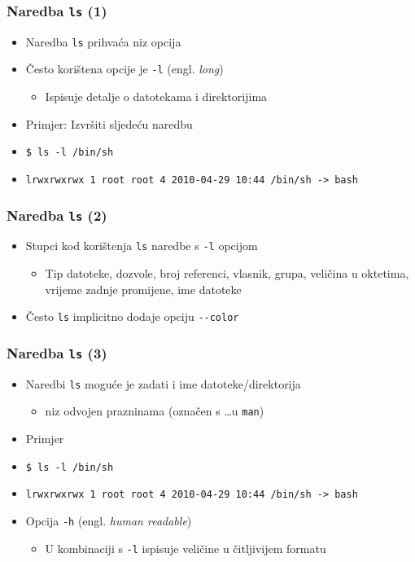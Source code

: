 \documentclass{beamer}
\begin{document}
\begin{frame}[t]
\frametitle{Naredba \texttt{ls} (1)}
\begin{itemize}
  \item Naredba \texttt{ls} prihvaća niz opcija
  \item Često korištena opcije je \texttt{-l} (engl. \emph{long})
  \begin{itemize}
    \item Ispisuje detalje o datotekama i direktorijima
  \end{itemize}
  \item Primjer: Izvršiti sljedeću naredbu
  \item[] \small\texttt{\$ ls -l /bin/sh}
  \item[] \small\texttt{lrwxrwxrwx 1 root root 4 2010-04-29 10:44 /bin/sh 
                        -> bash}
\end{itemize}
\end{frame}

\begin{frame}[t]
\frametitle{Naredba \texttt{ls} (2)}
\begin{itemize}
  \item Stupci kod korištenja \texttt{ls} naredbe s \texttt{-l} opcijom
  \begin{itemize}
    \item Tip datoteke, dozvole, broj referenci, vlasnik, grupa, veličina
          u oktetima, vrijeme zadnje promijene, ime datoteke
  \end{itemize}
  \item Često \texttt{ls} implicitno dodaje opciju \texttt{-{}-color}
\end{itemize}
\end{frame}

\begin{frame}[t]
\frametitle{Naredba \texttt{ls} (3)}
\begin{itemize}
  \item Naredbi \texttt{ls} moguće je zadati i ime datoteke/direktorija
  \begin{itemize}
    \item niz odvojen prazninama (označen s \ldots u \texttt{man})
  \end{itemize}
  \item Primjer
  \item[] \small\texttt{\$ ls -l /bin/sh}
  \item[] \small\texttt{lrwxrwxrwx 1 root root 4 2010-04-29 10:44 /bin/sh 
                        -> bash}
  \item Opcija \texttt{-h} (engl. \emph{human readable})
  \begin{itemize}
    \item U kombinaciji s \texttt{-l} ispisuje veličine u čitljivijem
          formatu
  \end{itemize}
\end{itemize}
\end{frame}
\end{document}
